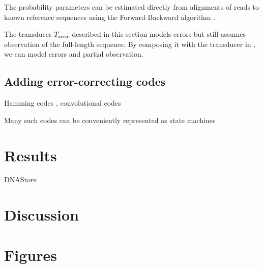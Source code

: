 \documentclass[english]{article}
\begin{document}
The probability parameters can be estimated directly from alignments of reads to known reference sequences using the Forward-Backward algorithm \cite{Durbin98}.

The transducer $T_{\mbox{\tiny error}}$
described in this section models errors but still assumes observation of the full-length sequence.
By composing it with the transducer in , we can model errors and partial observation.

\subsection{Adding error-correcting codes}

Hamming codes , convolutional codes %

Many such codes can be conveniently represented as state machines

\section{Results}

DNAStore

\section{Discussion}



\newpage
\section{Figures}
\end{document}
